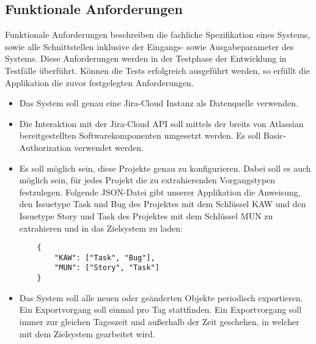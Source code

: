 \documentclass[10pt]{article}
\begin{document}
\subsection{Funktionale Anforderungen}
Funktionale Anforderungen beschreiben die fachliche Spezifikation eines Systems, sowie alle Schnittstellen inklusive der Eingangs- sowie Ausgabeparameter des Systems. Diese Anforderungen werden in der Testphase der Entwicklung in Testfälle überführt. Können die Tests erfolgreich ausgeführt werden, so erfüllt die Applikation die zuvor festgelegten Anforderungen.\\
\begin{itemize}
  \item Das System soll genau eine Jira-Cloud Instanz als Datenquelle verwenden. 
  \item Die Interaktion mit der Jira-Cloud API soll mittels der breits von Atlassian bereitgestellten Softwarekomponenten umgesetzt werden. Es soll Basic-Authorization verwendet werden.
  \item Es soll möglich sein, diese Projekte genau zu konfigurieren. Dabei soll es auch möglich sein, für jedes Projekt die zu extrahierenden Vorgangstypen festzulegen. Folgende JSON-Datei gibt unserer Applikation die Anweisung, den Issuetype Task und Bug des Projektes mit dem Schlüssel KAW und den Issuetype Story und Task des Projektes mit dem Schlüssel MUN zu extrahieren und in das Zielsystem zu laden:
    \begin{lstlisting}
    {
        "KAW": ["Task", "Bug"],
        "MUN": ["Story", "Task"]
    }
    \end{lstlisting}
  \item Das System soll alle neuen oder geänderten Objekte periodisch exportieren. Ein Exportvorgang soll einmal pro Tag stattfinden. Ein Exportvorgang soll immer zur gleichen Tageszeit und außerhalb der Zeit geschehen, in welcher mit dem Zielsystem gearbeitet wird.
\end{itemize}
\end{document}
